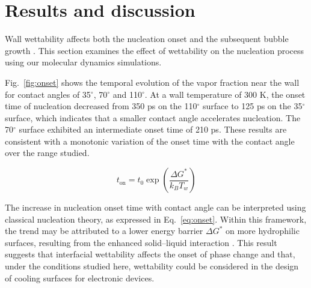 \section{Results and discussion}\label{sec:results}

Wall wettability affects both the nucleation onset and the subsequent bubble growth \cite{kim2015,chen2019}. This section examines the effect of wettability on the nucleation process using our molecular dynamics simulations.

Fig.~\ref{fig:onset} shows the temporal evolution of the vapor fraction near the wall for contact angles of 35$^\circ$, 70$^\circ$ and 110$^\circ$. At a wall temperature of 300 K, the onset time of nucleation decreased from 350 ps on the 110$^\circ$ surface to 125 ps on the 35$^\circ$ surface, which indicates that a smaller contact angle accelerates nucleation. The 70$^\circ$ surface exhibited an intermediate onset time of 210 ps. These results are consistent with a monotonic variation of the onset time with the contact angle over the range studied.

\begin{equation}
  t_{\mathrm{on}} = t_0 \exp\left(\frac{\Delta G^*}{k_B T_w}\right)
  \label{eq:onset}
\end{equation}

The increase in nucleation onset time with contact angle can be interpreted using classical nucleation theory, as expressed in Eq.~\eqref{eq:onset}. Within this framework, the trend may be attributed to a lower energy barrier $\Delta G^*$ on more hydrophilic surfaces, resulting from the enhanced solid--liquid interaction \cite{carey2018}. This result suggests that interfacial wettability affects the onset of phase change and that, under the conditions studied here, wettability could be considered in the design of cooling surfaces for electronic devices.
